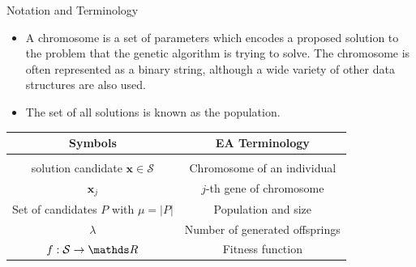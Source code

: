 \documentclass[11pt,compress,t,notes=noshow, xcolor=table]{beamer}
\begin{document}
\begin{vbframe}{Notation and Terminology}

\footnotesize
\begin{itemize}
\item A chromosome is a set of parameters which encodes a proposed solution to the problem that the genetic algorithm is trying to solve. The chromosome is often represented as a binary string, although a wide variety of other data structures are also used.\\
\item The set of all solutions is known as the population.
\end{itemize}
\vspace{0.5cm}
\normalsize
\begin{center}
\begin{tabular}{ c | c}
    \textbf{Symbols} & \textbf{EA Terminology} \\[0.05cm]
    \hline \\[0.01cm]
    solution candidate $\bm{x}\in \mathcal{S}$ & Chromosome of an individual \\[0.1cm]
    $\bm{x}_j$  & $j$-th gene of chromosome\\[0.1cm]
    Set of candidates $P$ with $\mu = |P|$ & Population and size \\[0.1cm]
    $\lambda$ & Number of generated offsprings\\[0.1cm]
    $f: \mathcal{S} \to \R$ & Fitness function
\end{tabular}
\end{center}




\end{vbframe}
\end{document}
